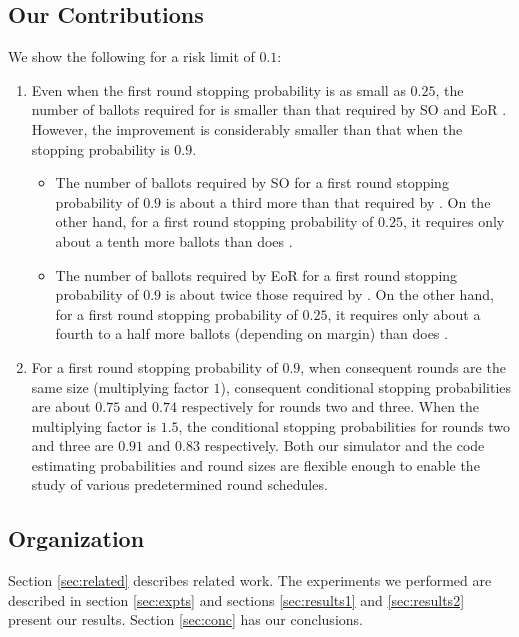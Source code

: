 \subsection{Our Contributions}
We show the following for a risk limit of $0.1$: 
\begin{enumerate}
\item Even when the first round stopping probability is as small as $0.25$, the number of ballots required for \Minerva is smaller than that required by SO \BRAVO and EoR \BRAVO. However, the improvement is considerably smaller than that when the stopping probability is $0.9$. 
\begin{itemize}
\item The number of ballots required by SO \BRAVO for a first round stopping probability of $0.9$ is about a third more than that required by \Minerva. On the other hand, for a first round stopping probability of $0.25$, it requires only about a tenth more ballots than does \Minerva.  
\item The number of ballots required by EoR \BRAVO for a first round stopping probability of $0.9$ is about twice those required by \Minerva. On the other hand, for a first round stopping probability of $0.25$, it requires only about a fourth to a half more ballots (depending on margin) than does \Minerva.  
\end{itemize}
\item For a first round stopping probability of $0.9$, when consequent \Minerva rounds are the same size (multiplying factor $1$), consequent conditional stopping probabilities are about $0.75$ and $0.74$ respectively for rounds two and three. When the multiplying factor is $1.5$, the conditional stopping probabilities for rounds two and three are $0.91$ and $0.83$ respectively. Both our simulator and the code estimating probabilities and round sizes are flexible enough to enable the study of various predetermined round schedules. 
\end{enumerate}

\subsection{Organization} Section \ref{sec:related} describes related work. The experiments we performed are described in section \ref{sec:expts} and sections \ref{sec:results1} and \ref{sec:results2} present our results. Section \ref{sec:conc} has our conclusions. 

